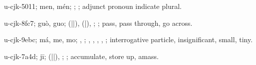 \begin{multicols}{2}
{\cjkgGlue{}u-cjk-5011; men, mén; \cjkgGlue{}; \cjkgGlue{}; adjunct pronoun indicate plural.

\cjkgGlue{}u-cjk-8fc7; guò, guo; \cjkgGlue{}\cjkgGlue{}(\cjkgGlue{}|\cjkgGlue{}|\cjkgGlue{}), \cjkgGlue{}\cjkgGlue{}(\cjkgGlue{}|\cjkgGlue{}), \cjkgGlue{}\cjkgGlue{}\cjkgGlue{}; \cjkgGlue{}; pass, pass through, go across.

\cjkgGlue{}u-cjk-9ebc; má, me, mo; \cjkgGlue{}, \cjkgGlue{}; \cjkgGlue{}, \cjkgGlue{}, \cjkgGlue{}, \cjkgGlue{}, \cjkgGlue{}; interrogative particle, insignificant, small, tiny.

\cjkgGlue{}u-cjk-7a4d; jī; \cjkgGlue{}\cjkgGlue{}(\cjkgGlue{}|\cjkgGlue{}|\cjkgGlue{}), \cjkgGlue{}\cjkgGlue{}\cjkgGlue{}; \cjkgGlue{}; accumulate, store up, amass.

}
\end{multicols}
